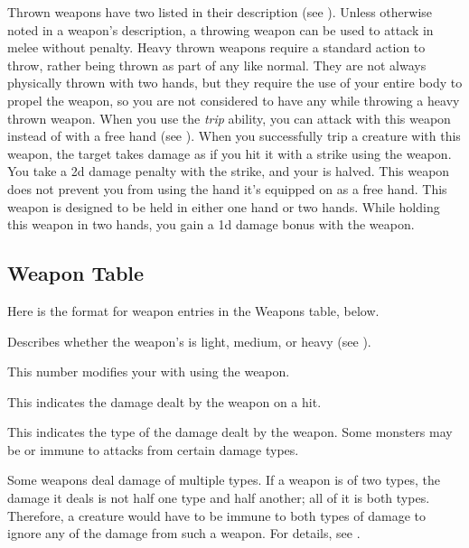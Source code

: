         Thrown weapons have two  listed in their description (see ).
        Unless otherwise noted in a weapon's description, a throwing weapon can be used to attack in melee without penalty.
        Heavy thrown weapons require a standard action to throw, rather being thrown as part of any  like normal.
        They are not always physically thrown with two hands, but they require the use of your entire body to propel the weapon, so you are not considered to have any  while throwing a heavy thrown weapon.
         When you use the \textit{trip} ability, you can attack with this weapon instead of with a free hand (see ).
        When you successfully trip a creature with this weapon, the target takes damage as if you hit it with a strike using the weapon.
        You take a \minus2d damage penalty with the strike, and your  is halved.
         This weapon does not prevent you from using the hand it's equipped on as a free hand.
         This weapon is designed to be held in either one hand or two hands.
        While holding this weapon in two hands, you gain a \plus1d damage bonus with the weapon.

    \subsection{Weapon Table}
        Here is the format for weapon entries in the Weapons table, below.

         Describes whether the weapon's  is light, medium, or heavy (see ).

         This number modifies your  with  using the weapon.

         This  indicates the damage dealt by the weapon on a hit.

         This indicates the type of the damage dealt by the weapon.
        Some monsters may be  or immune to attacks from certain damage types.

        Some weapons deal damage of multiple types. If a weapon is of two types, the damage it deals is not half one type and half another; all of it is both types.
        Therefore, a creature would have to be immune to both types of damage to ignore any of the damage from such a weapon.
        For details, see .

